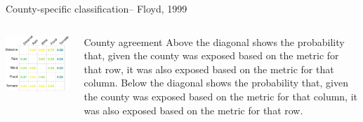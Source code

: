 \documentclass[ignorenonframetext,]{beamer}
\begin{document}
\begin{frame}{County-specific classification-- Floyd, 1999}

\begin{columns}
\begin{column}{0.6\textwidth}

\includegraphics[width=\textwidth]{anderson_jan18_files/figure-beamer/unnamed-chunk-19-1} 
\end{column}
\begin{column}{0.4\textwidth}
\small
\begin{block}{County agreement}
Above the diagonal shows the probability that, given the county was exposed based on the metric for that row, it was also exposed based on the metric for that column. Below the diagonal shows the probability that, given the county was exposed based on the metric for that column, it was also exposed based on the metric for that row.
\end{block}
\end{column}
\end{columns}

\end{frame}
\end{document}
